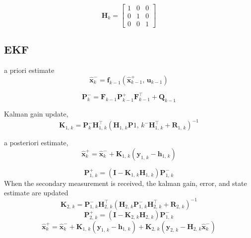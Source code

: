 	\begin{equation}
		\boldsymbol{H}_{k} =
		\begin{bmatrix}
			1	& 0	& 0	\\
			0	& 1	& 0	\\
			0	& 0	& 1
		\end{bmatrix}
	\end{equation}
	
	
\subsection{EKF}

	a priori estimate
	\begin{equation}
	\label{eq:x-}
		\hat{\boldsymbol{x}}_{k}^{-}=\boldsymbol{f}_{k-1}\left(\hat{\boldsymbol{x}}^{+}_{k-1},\,\boldsymbol{u}_{k-1}\right)
	\end{equation}
	
	\begin{equation}
	\label{eq:P+}
		\boldsymbol{P}_{k}^{-} = \boldsymbol{F}_{k-1}\boldsymbol{P}_{k-1}^{+}\boldsymbol{F}_{k-1}^{\top} + \boldsymbol{Q}_{k-1}
	\end{equation}
	
	Kalman gain update,
	\begin{equation}
	\label{eq:K}
		\boldsymbol{K}_{1,\,k} = \boldsymbol{P}_{k}^{-}\boldsymbol{H}_{1,\,k}^{\top}\left(\boldsymbol{H}_{1,\,k}\boldsymbol{P}{1,\,k}^{-}\boldsymbol{H}_{1,\,k}^{\top} + \boldsymbol{R}_{1,\,k} \right)^{-1}
	\end{equation}
	
	a posteriori estimate,
	\begin{equation}
	\label{eq:x+}
		\hat{\boldsymbol{x}}_{k}^{+}=\hat{\boldsymbol{x}}_{k}^{-} + \boldsymbol{K}_{1,\,k}\left(\boldsymbol{y}_{1,\,k}- \boldsymbol{h}_{1,\,k}\right)
	\end{equation}
	
	\begin{equation}
	\label{eq:p+}
		\boldsymbol{P}_{1,\,k}^{+} = \left(\boldsymbol{I} - \boldsymbol{K}_{1,\,k}\boldsymbol{H}_{1,\,k}\right)\boldsymbol{P}_{1,\,k}^{-}
	\end{equation}
	When the secondary measurement is received, the kalman gain, error, and state estimate are updated
	\begin{equation}
	\label{eq:K2}
		\boldsymbol{K}_{2,\,k} = \boldsymbol{P}_{1,\,k}^{-}\boldsymbol{H}_{2,\,k}^{\top}\left(\boldsymbol{H}_{2,\,k}\boldsymbol{P}_{1,\,k}^{-}\boldsymbol{H}_{2,\,k}^{\top} + \boldsymbol{R}_{2,\,k} \right)^{-1}
	\end{equation}
	\begin{equation}
	\label{eq:p2+}
		\boldsymbol{P}_{2,\,k}^{+} = \left(\boldsymbol{I} - \boldsymbol{K}_{2,\,k}\boldsymbol{H}_{2,\,k}\right)\boldsymbol{P}_{1,\,k}^{-}
	\end{equation}
	\begin{equation}
	\label{eq:x+sec}
		\hat{\boldsymbol{x}}_{k}^{+}=\hat{\boldsymbol{x}}_{k}^{-} + \boldsymbol{K}_{1,\,k}\left(\boldsymbol{y}_{1,\,k}- \boldsymbol{h}_{1,\,k}\right) + \boldsymbol{K}_{2,\,k}\left(\boldsymbol{y}_{2,\,k}-\boldsymbol{H}_{2,\,k}\hat{\boldsymbol{x}}_{k}^{-}\right)
	\end{equation}
	
